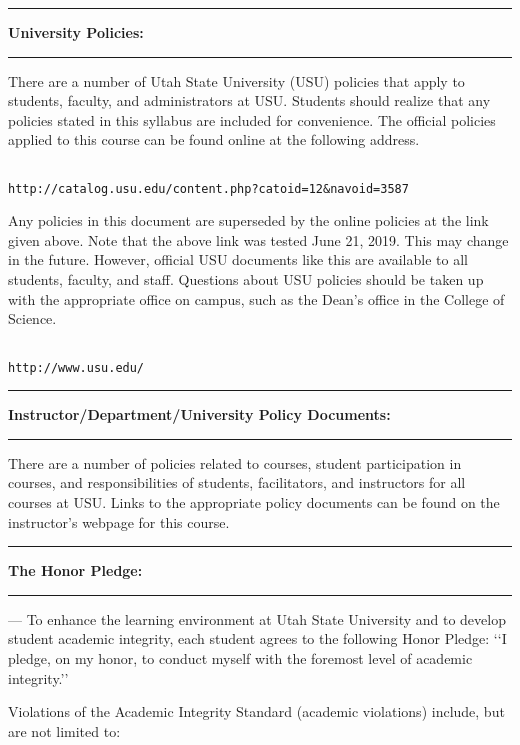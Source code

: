 \documentclass[10pt,fleqn]{article}
\begin{document}
\vskip0.1in\hrule\vskip0.1in
\noindent
{\bf University Policies:}
\vskip0.1in\hrule\vskip0.1in
\noindent
There are a number of Utah State University (USU) policies that apply to
students, faculty, and administrators at USU. Students should realize that any
policies stated in this syllabus are included for convenience. The official
policies applied to this course can be found online at the following address.
\begin{verbatim}

http://catalog.usu.edu/content.php?catoid=12&navoid=3587

\end{verbatim}
Any policies in this document are superseded by the online policies at the link
given above. Note that the above link was tested June 21, 2019. This may change
in the future. However, official USU documents like this are available to all
students, faculty, and staff. Questions about USU policies should be taken up
with the appropriate office on campus, such as the Dean's office in the College
of Science.
\begin{verbatim}

http://www.usu.edu/

\end{verbatim}
\vskip0.1in\hrule\vskip0.1in
\noindent
{\bf Instructor/Department/University Policy Documents:}
\vskip0.1in\hrule\vskip0.1in
\noindent
There are a number of policies related to courses, student participation in
courses, and responsibilities of students, facilitators, and instructors for all
courses at USU. Links to the appropriate policy documents can be found on the
instructor's webpage for this course.
\vskip0.1in\hrule\vskip0.1in
\noindent
{\bf The Honor Pledge:}
\vskip0.1in\hrule\vskip0.1in
\noindent
 — To enhance the learning environment at Utah State
University and to develop student academic integrity, each student agrees to the
following Honor Pledge: \lq\lq I pledge, on my honor, to conduct myself with the
foremost level of academic integrity.\rq\rq

\medskip

\noindent
Violations of the Academic Integrity Standard (academic violations) include,
but are not limited to:
\end{document}
